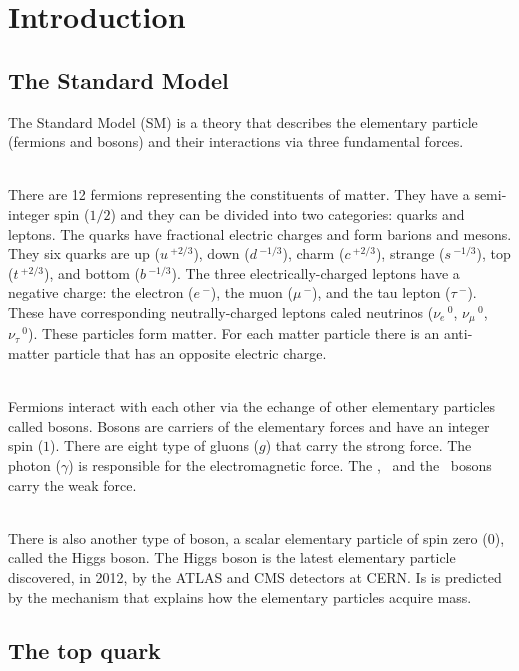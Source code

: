 \newpage

\section{Introduction}
\label{sec:Introduction}

\subsection{The Standard Model}
\label{sec:StandardModel}

The Standard Model (SM) is a theory that describes the elementary particle (fermions and bosons) and their interactions via three fundamental forces. 

\ \\There are 12 fermions representing the constituents of matter. They have a semi-integer spin ($1/2$) and they can be divided into two categories: quarks and leptons. The quarks have fractional electric charges and form barions and mesons. They six quarks are up ($u\,^{+2/3}$), down ($d\,^{-1/3}$), charm ($c\,^{+2/3}$), strange ($s\,^{-1/3}$), top ($t\,^{+2/3}$), and bottom ($b\,^{-1/3}$). The three electrically-charged leptons have a negative charge: the electron ($e\,^{-}$), the muon ($\mu\,^{-}$), and the tau lepton ($\tau\,^{-}$). These have corresponding neutrally-charged leptons caled neutrinos ($\nu_e\,^0$, $\nu_\mu\,^0$, $\nu_\tau\,^0$). These particles form matter. For each matter particle there is an anti-matter particle that has an opposite electric charge. 

\ \\Fermions interact with each other via the echange of other elementary particles called bosons. Bosons are carriers of the elementary forces and have an integer spin ($1$). There are eight type of gluons ($g$) that carry the strong force. The photon ($\gamma$) is responsible for the electromagnetic force. The \Wplus, \Wminus~and the \Zzero~bosons carry the weak force. 

\ \\There is also another type of boson, a scalar elementary particle of spin zero (0), called the Higgs boson. The Higgs boson is the latest elementary particle discovered, in 2012, by the ATLAS and CMS detectors at CERN. Is is predicted by the mechanism that explains how the elementary particles acquire mass.

\subsection{The top quark}
\label{sec:TopQuark}

